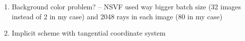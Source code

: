 \begin{enumerate}
    \item Background color problem?
    -- NSVF used way bigger batch size (32 images instead of 2 in my case) and 2048 rays in each image (80 in my case)
    \item Implicit scheme with tangential coordinate system
\end{enumerate}

























